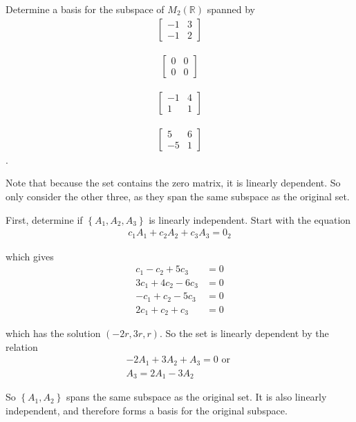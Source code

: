 \begin{problem}[?]

Determine a basis for the subspace of \(M_2(\mathbb{R})\) spanned by
\begin{align*}\begin{bmatrix}
-1 & 3 \\
-1 & 2
\end{bmatrix}\end{align*}

\begin{align*}\begin{bmatrix}
0 & 0 \\
0 & 0
\end{bmatrix}\end{align*}

\begin{align*}\begin{bmatrix}
-1 & 4 \\
1 & 1
\end{bmatrix}\end{align*}

\begin{align*}\begin{bmatrix}
5 & 6 \\
-5 & 1
\end{bmatrix}\end{align*}.\\

\end{problem}

\begin{solution}

Note that because the set contains the zero matrix, it is linearly
dependent. So only consider the other three, as they span the same
subspace as the original set.

First, determine if \(\left\{ A_1, A_2, A_3\right\}\) is linearly
independent. Start with the equation
\begin{align*}
c_1A_1 + c_2A_2 + c_3A_3 = 0_2
\end{align*}

which gives
\begin{align*}
c_1 -   c_2 +   5c_3    &= 0 \\
3c_1 +  4c_2 -  6c_3    &= 0 \\
-c_1 +  c_2 -   5c_3    &= 0 \\
2c_1 +  c_2 +   c_3     &= 0
\end{align*}

which has the solution \((-2r,3r,r)\). So the set is linearly dependent
by the relation
\begin{align*}
-2A_1 + 3A_2 + A_3 = 0 \text{ or }\\
A_3 = 2A_1 - 3A_2
\end{align*}

So \(\left\{A_1, A_2\right\}\) spans the same subspace as the original
set. It is also linearly independent, and therefore forms a basis for
the original subspace.

\end{solution}

